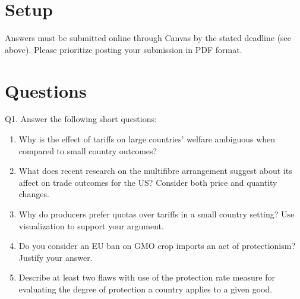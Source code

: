 \documentclass[12pt]{article}
\begin{document}
\singlespacing


\bigskip

\doublespacing



\section*{Setup}

\noindent 
Answers must be submitted online through Canvas by the stated deadline (see above).
Please prioritize posting your submission in PDF format.

\section*{Questions}

\noindent Q1. Answer the following short questions:

\begin{enumerate}[1)]
	
	\item Why is the effect of tariffs on large countries' welfare ambiguous when compared to small country outcomes?
	
	\vspace{1in}
	
	\item What does recent research on the multifibre arrangement suggest about its affect on trade outcomes for the US? Consider both price and quantity changes.  
	
	\vspace{1in}
	
	\newpage
	
	\item Why do producers prefer quotas over tariffs in a small country setting? Use visualization to support your argument. 
	
	\vspace{3in}
	
	\item Do you consider an EU ban on GMO crop imports an act of protectionism? Justify your answer.  
	
	\vspace{1.5in}
	
	\item Describe at least two flaws with use of the protection rate measure for evaluating the degree of protection a country applies to a given good. 
	
	\vspace{1in}
	
\end{enumerate}
\end{document}
